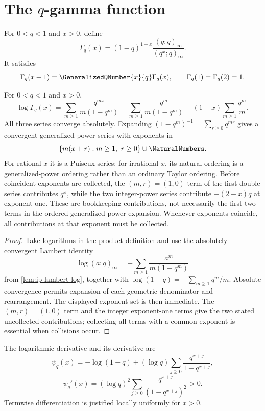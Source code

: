 \section{\texorpdfstring{The \(q\)-gamma function}{The q-gamma function}}
\label{sec:qs-qgamma}

For \(0<q<1\) and \(x>0\), define
\[
  \Gamma_q(x)
  =(1-q)^{1-x}\frac{(q;q)_\infty}{(q^x;q)_\infty}.
\]
It satisfies
\[
  \Gamma_q(x+1)=\GeneralizedQNumber{x}{q}\Gamma_q(x),
  \qquad
  \Gamma_q(1)=\Gamma_q(2)=1.
\]

\begin{proposition}[Exact generalized expansion at \(q=0\)]
\label{prop:qs-qgamma-zero}
For \(0<q<1\) and \(x>0\),
\[
  \log\Gamma_q(x)
  =\sum_{m\ge1}\frac{q^{mx}}{m(1-q^m)}
   -\sum_{m\ge1}\frac{q^m}{m(1-q^m)}
   -(1-x)\sum_{m\ge1}\frac{q^m}{m}.
\]
All three series converge absolutely.  Expanding
\((1-q^m)^{-1}=\sum_{r\ge0}q^{mr}\) gives a convergent generalized power
series with exponents in
\[
  \{m(x+r):m\ge1,\ r\ge0\}\cup\NaturalNumbers.
\]
For rational \(x\) it is a Puiseux series; for irrational \(x\), its natural
ordering is a generalized-power ordering rather than an ordinary Taylor
ordering.  Before coincident exponents are collected, the \((m,r)=(1,0)\)
term of the first double series contributes \(q^x\), while the two
integer-power series contribute \(-(2-x)q\) at exponent one.  These are
bookkeeping contributions, not necessarily the first two terms in the
ordered generalized-power expansion.  Whenever exponents coincide, all
contributions at that exponent must be collected.
\end{proposition}

\begin{proof}
Take logarithms in the product definition and use the absolutely convergent
Lambert identity
\[
  \log(a;q)_\infty
  =-\sum_{m\ge1}\frac{a^m}{m(1-q^m)}
\]
from \cref{lem:ip-lambert-log}, together with
\(\log(1-q)=-\sum_{m\ge1}q^m/m\).  Absolute convergence permits expansion of
each geometric denominator and rearrangement.  The displayed exponent set is
then immediate.  The \((m,r)=(1,0)\) term and the integer exponent-one terms
give the two stated uncollected contributions; collecting all terms with a
common exponent is essential when collisions occur.
\end{proof}

The logarithmic derivative and its derivative are
\[
  \psi_q(x)
  =-\log(1-q)+(\log q)
    \sum_{j\ge0}\frac{q^{x+j}}{1-q^{x+j}},
\]
\[
  \psi_q'(x)
  =(\log q)^2
    \sum_{j\ge0}\frac{q^{x+j}}{(1-q^{x+j})^2}>0.
\]
Termwise differentiation is justified locally uniformly for \(x>0\).

